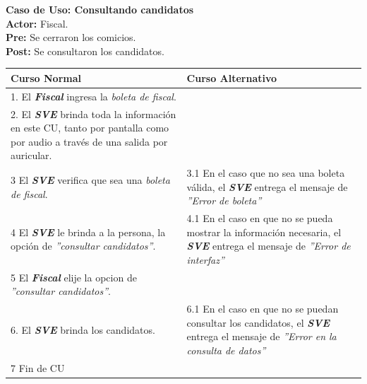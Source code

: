 \documentclass[spanish, 10pt,a4paper]{article}
\numberwithin{equation}{section} %
\begin{document}
\noindent\textbf{Caso de Uso: Consultando candidatos}\\
\textbf{Actor: } Fiscal.\\
\textbf{Pre: } Se cerraron los comicios.\\
\textbf{Post: } Se consultaron los candidatos.\\
\begin{table}[H]
  \centering
\bgroup
\def\arraystretch{1.3}
  \begin{tabular}{p{9cm} | p{7cm}}
    \hline
    Curso Normal & Curso Alternativo \\
    \hline
    \hline    
    1. El \textbf{\textit{Fiscal}} ingresa la \textit{boleta de fiscal}. 
    & \\
    
    \hline
    2. El \textbf{\textit{SVE}} brinda toda la información en este CU, tanto por pantalla como por audio a través de una salida por auricular.
    &
    \\
    
    \hline
    3 El \textbf{\textit{SVE}} verifica que sea una \textit{boleta de fiscal}.
    & 
    3.1 En el caso que no sea una boleta válida, el \textbf{\textit{SVE}} entrega el mensaje de \textit{''Error de boleta''}
    \\
    
    \hline
    4 El \textbf{\textit{SVE}} le brinda a la persona, la opción de \textit{''consultar candidatos''}.
    & 
    4.1 En el caso en que no se pueda mostrar la información necesaria, el \textbf{\textit{SVE}} entrega el mensaje de \textit{''Error de interfaz''}
    \\
    
    \hline
    5 El \textbf{\textit{Fiscal}} elije la opcion de \textit{''consultar candidatos''}.
    & \\
    
    \hline
    6. El \textbf{\textit{SVE}} brinda los candidatos.
    &
    6.1 En el caso en que no se puedan consultar los candidatos, el \textbf{\textit{SVE}} entrega el mensaje de \textit{''Error en la consulta de datos''}
    \\
    
    \hline
    7 Fin de CU
    & \\
    \hline
  \end{tabular}
\egroup
\end{table}
\end{document}
